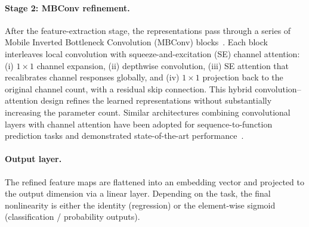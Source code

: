 \documentclass[11pt]{article}
\begin{document}
\paragraph{Stage 2: MBConv refinement.}
After the feature-extraction stage, the representations pass through a series
of Mobile Inverted Bottleneck Convolution (MBConv) blocks~\cite{tan2019efficientnet}.
Each block interleaves local convolution with squeeze-and-excitation (SE)
channel attention: (i) $1\!\times\!1$ channel expansion, (ii) depthwise
convolution, (iii) SE attention that recalibrates channel responses globally,
and (iv) $1\!\times\!1$ projection back to the original channel count, with a
residual skip connection.  This hybrid convolution--attention design refines
the learned representations without substantially increasing the parameter count.
Similar architectures combining convolutional layers with channel attention have
been adopted for sequence-to-function prediction tasks and demonstrated
state-of-the-art performance~\cite{penzar2023legnet}.

\paragraph{Output layer.}
The refined feature maps are flattened into an embedding vector and projected to
the output dimension via a linear layer.  Depending on the task, the final
nonlinearity is either the identity (regression) or the element-wise sigmoid
(classification / probability outputs).



\end{document}
